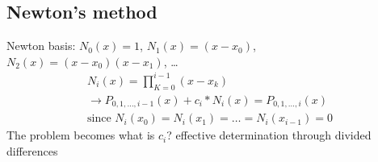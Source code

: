 \subsection{Newton's method}\label{subsec:newton's-method}
Newton basis: $N_0 (x) = 1$, $N_1(x) =(x-x_0)$, $N_2(x)=(x-x_0)(x-x_1)$, \ldots
\begin{align*}
    N_i(x)=\prod_{K=0}^{i-1}(x-x_k)\\
    \to P_{0,1,\ldots, i-1}(x)+c_i * N_i(x) = P_{0,1,\ldots, i}(x)\\
    \text{since } N_i(x_0)=N_i(x_1)=\ldots=N_i(x_{i-1})=0
\end{align*}
The problem becomes what is $c_i$?
effective determination through divided differences
